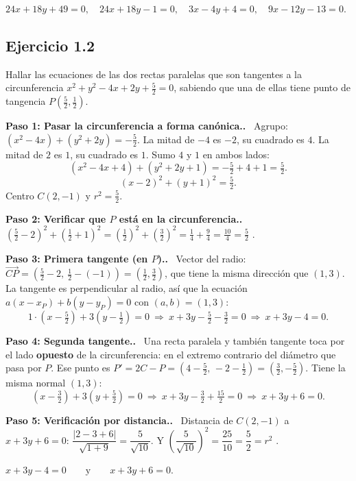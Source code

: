 \documentclass[11pt,a4paper]{article}
\newcommand{\paso}[1]{\par\medskip\noindent\textbf{\textcolor{blue!50!black}{Paso #1.}}\ }
\begin{document}
\begin{respuesta}
$24x+18y+49=0,\quad 24x+18y-1=0,\quad 3x-4y+4=0,\quad 9x-12y-13=0.$
\end{respuesta}

\subsection{Ejercicio 1.2}
\begin{enunciado}
Hallar las ecuaciones de las dos rectas paralelas que son tangentes a la circunferencia
$x^2+y^2-4x+2y+\frac52=0$, sabiendo que una de ellas tiene punto de tangencia $P\left(\frac52,\frac12\right)$.
\end{enunciado}

\paso{1: Pasar la circunferencia a forma canónica.} Agrupo:
$(x^2-4x)+(y^2+2y)=-\frac52$.
La mitad de $-4$ es $-2$, su cuadrado es $4$. La mitad de $2$ es $1$, su cuadrado es $1$. Sumo $4$ y $1$ en ambos lados:
\[ (x^2-4x+4)+(y^2+2y+1)=-\tfrac52+4+1=\tfrac52. \]
\[ (x-2)^2+(y+1)^2=\tfrac52. \]
Centro $C(2,-1)$ y $r^2=\frac52$.

\paso{2: Verificar que $P$ está en la circunferencia.}
$\left(\frac52-2\right)^2+\left(\frac12+1\right)^2=\left(\frac12\right)^2+\left(\frac32\right)^2=\frac14+\frac94=\frac{10}4=\frac52$ \checkmark.

\paso{3: Primera tangente (en $P$).}
Vector del radio: $\overrightarrow{CP}=\left(\frac52-2,\ \frac12-(-1)\right)=\left(\frac12,\frac32\right)$, que tiene la misma dirección que $(1,3)$.
La tangente es perpendicular al radio, así que la ecuación $a(x-x_P)+b(y-y_P)=0$ con $(a,b)=(1,3)$:
\[ 1\cdot\left(x-\tfrac52\right)+3\left(y-\tfrac12\right)=0\ \Rightarrow\ x+3y-\tfrac52-\tfrac32=0\ \Rightarrow\ x+3y-4=0. \]

\paso{4: Segunda tangente.} Una recta paralela y también tangente toca por el lado \textbf{opuesto} de la circunferencia: en el extremo contrario del diámetro que pasa por $P$.
Ese punto es $P'=2C-P=(4-\frac52,\,-2-\frac12)=\left(\frac32,-\frac52\right)$.
Tiene la misma normal $(1,3)$:
\[ \left(x-\tfrac32\right)+3\left(y+\tfrac52\right)=0\ \Rightarrow\ x+3y-\tfrac32+\tfrac{15}2=0\ \Rightarrow\ x+3y+6=0. \]

\paso{5: Verificación por distancia.} Distancia de $C(2,-1)$ a $x+3y+6=0$:
$\dfrac{|2-3+6|}{\sqrt{1+9}}=\dfrac5{\sqrt{10}}$. Y $\left(\dfrac5{\sqrt{10}}\right)^2=\dfrac{25}{10}=\dfrac52=r^2$ \checkmark.

\begin{respuesta}
$x+3y-4=0\qquad\text{y}\qquad x+3y+6=0.$
\end{respuesta}
\end{document}
